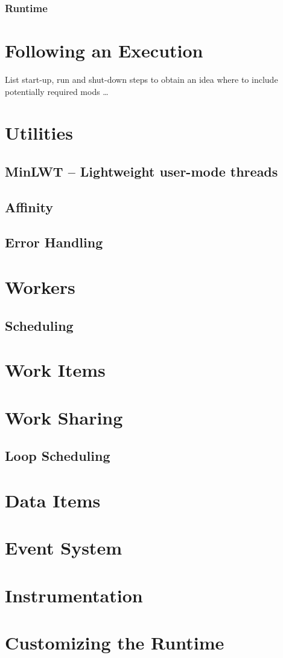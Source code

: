 \subsubsection{Runtime}


\section{Following an Execution}
List start-up, run and shut-down steps to obtain an idea where to include
potentially required mods \ldots

\section{Utilities}
\subsection{MinLWT -- Lightweight user-mode threads}
\subsection{Affinity}
\subsection{Error Handling}
\section{Workers}
\subsection{Scheduling}
\section{Work Items}
\section{Work Sharing}
\subsection{Loop Scheduling}
\section{Data Items}
\section{Event System}
\section{Instrumentation}
\section{Customizing the Runtime}

